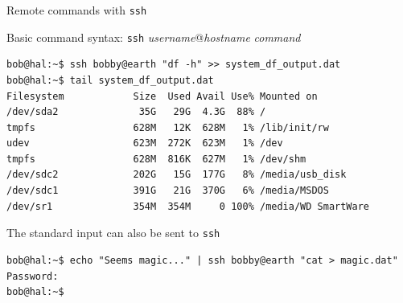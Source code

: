 \begin{frame}[t,fragile]{Remote commands with \alert{\texttt{ssh}}}


  \begin{block}{Basic command syntax: \alert{\texttt{ssh} \emph{username}@\emph{hostname} \emph{command}}}
    {\footnotesize 
  \begin{lstlisting}
bob@hal:~$ ssh bobby@earth "df -h" >> system_df_output.dat
bob@hal:~$ tail system_df_output.dat
Filesystem            Size  Used Avail Use% Mounted on
/dev/sda2              35G   29G  4.3G  88% /
tmpfs                 628M   12K  628M   1% /lib/init/rw
udev                  623M  272K  623M   1% /dev
tmpfs                 628M  816K  627M   1% /dev/shm
/dev/sdc2             202G   15G  177G   8% /media/usb_disk
/dev/sdc1             391G   21G  370G   6% /media/MSDOS
/dev/sr1              354M  354M     0 100% /media/WD SmartWare
  \end{lstlisting}
}

{\footnotesize The standard input can also be sent to \texttt{\alert{ssh}}}
    {\scriptsize 
  \begin{lstlisting}
bob@hal:~$ echo "Seems magic..." | ssh bobby@earth "cat > magic.dat"
Password:
bob@hal:~$ 
  \end{lstlisting}
}

  \end{block}
  
\end{frame}
